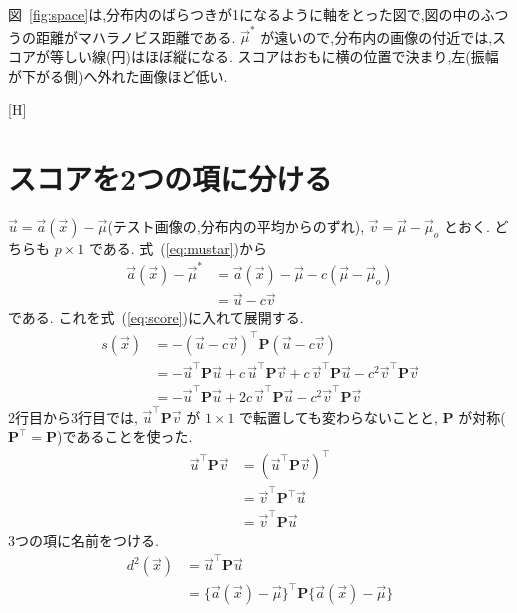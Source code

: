 \documentclass[MIRU,submit,onecolumn]{miru2025j}
\makeatletter
\newcommand{\vmu}{\vec{\mu}}\newcommand{\va}{\vec{a}}\newcommand{\vx}{\vec{x}}\newcommand{\vu}{\vec{u}}\newcommand{\vv}{\vec{v}}
\newcommand{\Pm}{\mathbf{P}}\newcommand{\Sm}{\mathbf{S}}\newcommand{\Id}{\mathbf{I}}\newcommand{\Gm}{\mathbf{G}}
\renewenvironment{figure}{\@floatenv\capwidth\textwidth\ecapwidth\textwidth\abovecaptionskip1mm\belowcaptionskip\z@\@float{figure}}{\end@float}
\renewcommand{\eqref}[1]{(\ref{#1})}
\makeatother
\begin{document}
図~\ref{fig:space}は,分布内のばらつきが1になるように軸をとった図で,図の中のふつうの距離がマハラノビス距離である. $\vmu^{*}$ が遠いので,分布内の画像の付近では,スコアが等しい線(円)はほぼ縦になる. スコアはおもに横の位置で決まり,左(振幅が下がる側)へ外れた画像ほど低い.

\begin{figure}[H]\centering

\caption{形の確認($p=23$. 1マスが数1つ). (a) 式~\eqref{eq:score}. (b) 式~\eqref{eq:ell}：$\vv^{\top}$(横)と $\Pm\vu$(縦)の積,つまり内積. どちらも結果は $1\times 1$ の行列,つまり数1つ(スカラー)である.}
\label{fig:shape}
\end{figure}

\section{スコアを2つの項に分ける}
\label{sec:terms}
$\vu=\va(\vx)-\vmu$(テスト画像の,分布内の平均からのずれ), $\vv=\vmu-\vmu_{o}$ とおく. どちらも $p\times 1$ である. 式~\eqref{eq:mustar}から
\begin{equation}
\begin{split}
\va(\vx)-\vmu^{*}
&=\va(\vx)-\vmu-c(\vmu-\vmu_{o})\\
&=\vu-c\vv
\end{split}
\label{eq:shift}
\end{equation}
である. これを式~\eqref{eq:score}に入れて展開する.
\begin{equation}
\begin{split}
s(\vx)
&=-(\vu-c\vv)^{\top}\Pm(\vu-c\vv)\\
&=-\vu^{\top}\Pm\vu+c\,\vu^{\top}\Pm\vv+c\,\vv^{\top}\Pm\vu-c^{2}\vv^{\top}\Pm\vv\\
&=-\vu^{\top}\Pm\vu+2c\,\vv^{\top}\Pm\vu-c^{2}\vv^{\top}\Pm\vv
\end{split}
\label{eq:expand0}
\end{equation}
2行目から3行目では, $\vu^{\top}\Pm\vv$ が $1\times 1$ で転置しても変わらないことと, $\Pm$ が対称($\Pm^{\top}=\Pm$)であることを使った.
\begin{equation}
\begin{split}
\vu^{\top}\Pm\vv
&=(\vu^{\top}\Pm\vv)^{\top}\\
&=\vv^{\top}\Pm^{\top}\vu\\
&=\vv^{\top}\Pm\vu
\end{split}
\label{eq:sym}
\end{equation}
3つの項に名前をつける.
\begin{equation}
\begin{split}
d^{2}(\vx)
&=\vu^{\top}\Pm\vu\\
&=\{\va(\vx)-\vmu\}^{\top}\Pm\{\va(\vx)-\vmu\}
\end{split}
\label{eq:dsq}
\end{equation}
\end{document}
